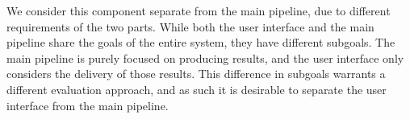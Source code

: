 We consider this component separate from the main pipeline, due to different requirements of the two parts. While both the user interface and the main pipeline share the goals of the entire system, they have different subgoals. The main pipeline is purely focused on producing results, and the user interface only considers the delivery of those results. This difference in subgoals warrants a different evaluation approach, and as such it is desirable to separate the user interface from the main pipeline.










